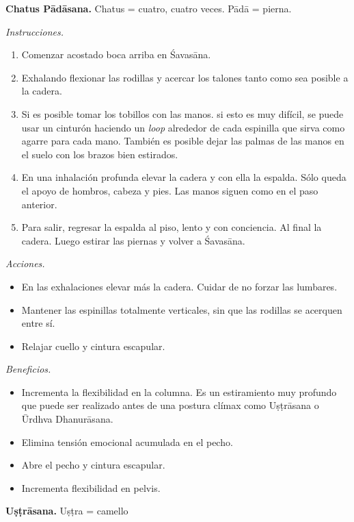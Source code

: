 \medskip\noindent\textbf{Chatus Pādāsana.}
Chatus = cuatro, cuatro veces. Pādā = pierna.

\emph{Instrucciones.}
\begin{enumerate}
\item Comenzar acostado boca arriba en
Śavasāna.
\item Exhalando flexionar las rodillas y
acercar los talones tanto como sea posible a
la cadera.
\item Si es posible tomar los tobillos con
las manos. si esto es muy difícil, se puede
usar un cinturón haciendo un \emph{loop}
alrededor de cada espinilla que sirva como
agarre para cada mano. También es posible
dejar las palmas de las manos en el suelo con
los brazos bien estirados.
\item En una inhalación profunda elevar la
cadera y con ella la espalda. Sólo queda el
apoyo de hombros, cabeza y pies. Las manos
siguen como en el paso anterior.
\item Para salir, regresar la espalda al
piso, lento y con conciencia. Al final la
cadera. Luego estirar las piernas y volver a
Śavasāna.
\end{enumerate}

\emph{Acciones.}
\begin{itemize}
\item En las exhalaciones elevar más la
cadera. Cuidar de no forzar las lumbares.
\item Mantener las espinillas totalmente
verticales, sin que las rodillas se acerquen
entre sí.
\item Relajar cuello y cintura escapular.
\end{itemize}

\emph{Beneficios.}
\begin{itemize}
\item Incrementa la flexibilidad en la
columna. Es un estiramiento muy profundo que
puede ser realizado antes de una postura
clímax como Uṣṭrāsana o Ūrdhva Dhanurāsana.
\item Elimina tensión emocional acumulada en
el pecho.
\item Abre el pecho y cintura escapular.
\item Incrementa flexibilidad en pelvis.
\end{itemize}

\medskip\noindent\textbf{Uṣṭrāsana.}
Uṣṭra = camello

